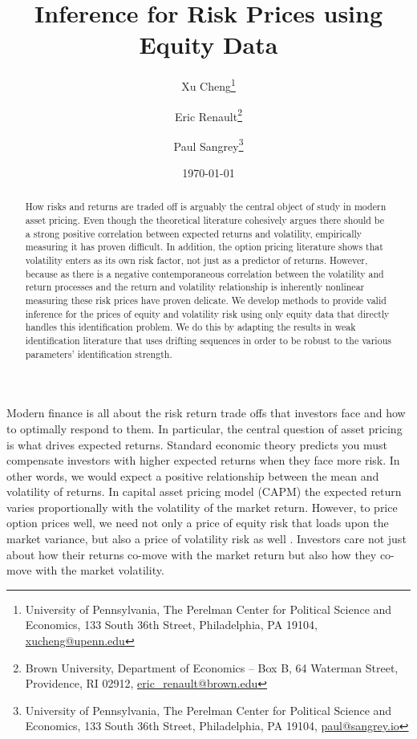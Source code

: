 \documentclass[11pt, letterpaper, twoside, final]{article}
\author{Xu Cheng\thanks{University of Pennsylvania, The Perelman Center for Political Science and
    Economics, 133 South 36th Street, Philadelphia, PA 19104, \href{mailto:xucheng@upenn.edu}{xucheng@upenn.edu}}
    \and 
    Eric Renault\thanks{Brown University, Department of Economics -- Box B, 64 Waterman Street, Providence, RI
    02912, \href{mailto:eric_renault@brown.edu}{eric\_renault@brown.edu}}
    \and 
    Paul Sangrey\thanks{University of Pennsylvania, The Perelman Center for Political Science and
    Economics, 133 South 36th Street, Philadelphia, PA 19104, \href{mailto:paul@sangrey.io}{paul@sangrey.io}}}
\title{Inference for Risk Prices using Equity Data}
\date{\today}
\begin{document}
\begin{titlepage}


    \maketitle
    \thispagestyle{empty}
    \addtocounter{page}{-1}

    \begin{abstract} \singlespacing \noindent 
        How risks and returns are traded off is arguably the central object of study in modern asset pricing. 
        Even though the theoretical literature cohesively argues there should be a strong positive correlation
        between expected returns and volatility, empirically measuring it has proven difficult. 
        In addition, the option pricing literature shows that volatility enters as its own risk factor, not just
        as a predictor of returns.
        However, because as there is a negative contemporaneous correlation between the volatility and return
        processes and the return and volatility relationship is inherently nonlinear measuring these risk prices
        have proven delicate. 
        We develop methods to provide  valid inference for the prices of equity and volatility risk using only
        equity data that directly handles this identification problem. 
        We do this by adapting the results in weak identification literature that uses drifting sequences in order
        to be robust to the various parameters' identification strength. 
    \end{abstract}



\end{titlepage}

\tableofcontents
\clearpage

{}

Modern finance is all about the risk return trade offs that investors face and how to optimally respond to them. 
In particular, the central question of asset pricing is what drives expected returns.
Standard economic theory predicts you must compensate investors with higher expected returns when they face more
risk.
In other words, we would expect a positive relationship between the mean and volatility of returns.
In  capital asset pricing model (CAPM) the expected
return varies proportionally with the volatility of the market return.
However, to price option prices well, we need not only a price of equity risk that loads upon the market variance,
but also a price of volatility risk as well \parencite{christoffersen2013capturing}.
Investors care not just about how their returns co-move with the market return but also how they co-move with the
market volatility.
\end{document}
